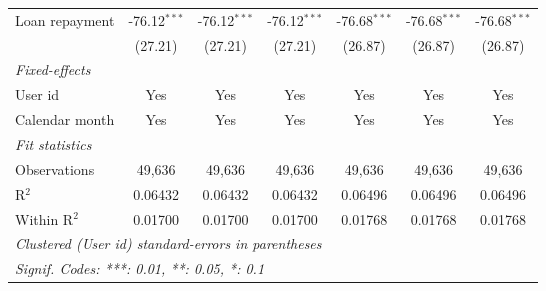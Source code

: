 \begin{table}[htbp]
\begin{footnotesize}
\begin{tabular}{lcccccc}
         Loan repayment                   & -76.12$^{***}$ & -76.12$^{***}$ & -76.12$^{***}$ & -76.68$^{***}$  & -76.68$^{***}$   & -76.68$^{***}$\\
                                          & (27.21)        & (27.21)        & (27.21)        & (26.87)         & (26.87)          & (26.87)\\
         \midrule \emph{Fixed-effects} &   &   &   &   &   &  \\
         User id                          & Yes            & Yes            & Yes            & Yes             & Yes              & Yes\\
         Calendar month                   & Yes            & Yes            & Yes            & Yes             & Yes              & Yes\\
         \midrule \emph{Fit statistics} &   &   &   &   &   &  \\
         Observations                     & 49,636         & 49,636         & 49,636         & 49,636          & 49,636           & 49,636\\
         R$^2$                            & 0.06432        & 0.06432        & 0.06432        & 0.06496         & 0.06496          & 0.06496\\
         Within R$^2$                     & 0.01700        & 0.01700        & 0.01700        & 0.01768         & 0.01768          & 0.01768\\
         \midrule\midrule\multicolumn{7}{l}{\emph{Clustered (User id) standard-errors in parentheses}}\\
         \multicolumn{7}{l}{\emph{Signif. Codes: ***: 0.01, **: 0.05, *: 0.1}}\\
      \end{tabular}
   \end{footnotesize}
\end{table}


